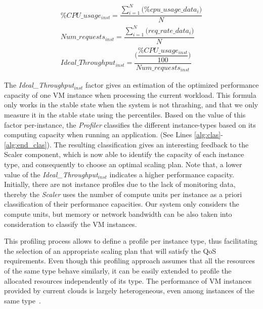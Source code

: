 

{\scriptsize
\begin{equation}\label{cpu_speed}
\begin{split}
\% CPU\_usage_{inst} = \dfrac{   \sum_{i=1}^N \big( \% cpu\_usage\_data_{i}  \big) } { N } \\
Num\_requests_{inst} = \dfrac{   \sum_{i=1}^N \big( req\_rate\_data_{i} \big) } { N } \\
Ideal\_Throughput_{inst} =\dfrac{ \bigg( \dfrac{\% CPU\_usage_{inst} } { 100 }  \bigg) } {  Num\_requests_{inst}   } 
\end{split}
\end{equation}
}

The \emph{Ideal\_Throughput$_{inst}$} factor gives an estimation of the optimized performance capacity of one VM instance when processing the current workload. This formula only works in the stable state when the system is not thrashing, and that we only measure it in the stable state using the percentiles. Based on the value of this factor per-instance, the \emph{Profiler} classifies the different instance-types based on its computing capacity when running an application. (See Lines \ref{alg:clas}-\ref{alg:end_clas}). The resulting classification gives an interesting feedback to the Scaler component, which is now able to identify the capacity of each instance type, and consequently to choose an optimal scaling plan. Note that, a lower value of the \emph{Ideal\_Throughput$_{inst}$} indicates a higher performance capacity. Initially, there are not instance profiles due to the lack of monitoring data, thereby the \emph{Scaler} uses the number of compute units per instance as a priori classification of their performance capacities. Our system only considers the compute units, but memory or network bandwidth can be also taken into consideration to classify the VM instances.

\vspace{2mm}
This profiling process allows to define a profile per instance type, thus facilitating the selection of an appropriate scaling plan that will satisfy the QoS requirements. Even though this profiling approach assumes that all the resources of the same type behave similarly, it can be easily extended to profile the allocated resources independently of its type. The performance of VM instances provided by current clouds is largely heterogeneous, even among instances of the same type~\cite{ec2Performance}.




